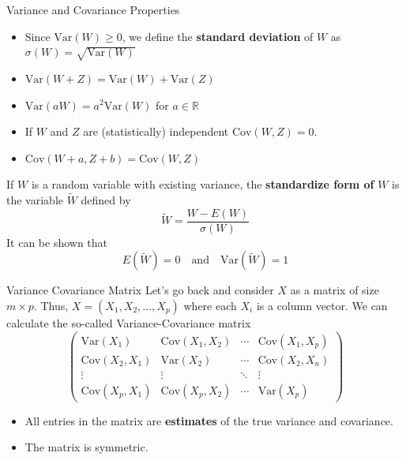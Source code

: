 \documentclass{beamer}
\begin{document}
\begin{frame}{Variance and Covariance Properties}
	\begin{itemize}
		\item Since $\textrm{Var}(W) \ge 0$, we define the {\bf standard deviation} of $W$ as $\sigma(W)=\sqrt{\textrm{Var}(W)}$
		\item $\textrm{Var}(W+Z)= \textrm{Var}(W)+ \textrm{Var}(Z)$
		\item $\textrm{Var}(aW)= a^2 \textrm{Var}(W)$ for $a \in \mathbb{R}$
		\item If $W$ and $Z$ are (statistically) independent $\textrm{Cov}(W,Z)= 0$.
		\item $\textrm{Cov}(W+a,Z+b)= \textrm{Cov}(W,Z)$
	\end{itemize}
	
	If $W$ is a random variable with existing variance, the {\bf standardize form of } $W$ is the variable $\tilde{W}$ defined by 
	\begin{equation*}
		\tilde{W}= \frac{W - E(W)}{\sigma(W)}
	\end{equation*}
It can be shown that
\begin{equation*}
	E(\tilde{W})=0 \quad \textrm{and} \quad \textrm{Var}(\tilde{W})= 1
\end{equation*}
\end{frame}

\begin{frame}{Variance Covariance Matrix}
	Let's go back and consider $X$ as a matrix of size $m \times p$.
	Thus, $X=(X_1, X_2, \ldots, X_p)$ where each $X_i$ is a column vector. We can calculate the so-called Variance-Covariance matrix
	\begin{equation*}
		\begin{pmatrix}
			\textrm{Var}(X_1) & \textrm{Cov}(X_1,X_2) & \cdots & \textrm{Cov}(X_1,X_p) \\
			\textrm{Cov}(X_2,X_1) & \textrm{Var}(X_2) & \cdots & \textrm{Cov}(X_2,X_n) \\
			\vdots & \vdots & \ddots & \vdots\\
			\textrm{Cov}(X_p,X_1) & \textrm{Cov}(X_p,X_2) & \cdots & \textrm{Var}(X_p)
		\end{pmatrix}
	\end{equation*}

\begin{itemize}
	\item All entries in the matrix are {\bf estimates} of the true variance and covariance.
	\item The matrix is symmetric.
\end{itemize} 
\end{frame}
\end{document}
